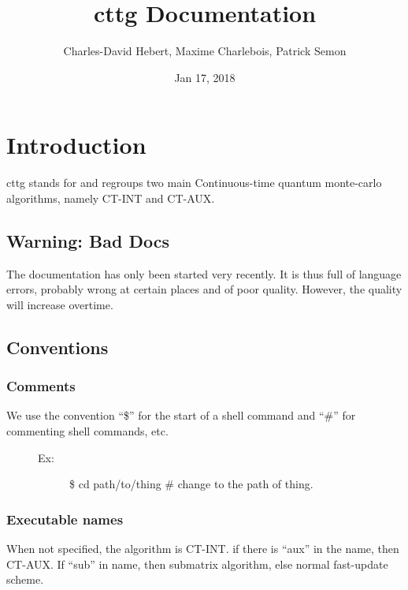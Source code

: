 \documentclass[letterpaper,10pt,english]{sphinxmanual}
\title{cttg Documentation}
\date{Jan 17, 2018}
\author{Charles-David Hebert, Maxime Charlebois, Patrick Semon}
\begin{document}
\maketitle
\sphinxtableofcontents
{}\label{\detokenize{index::doc}}



\chapter{Introduction}
\label{\detokenize{intro:welcome-to-cttg-s-documentation}}\label{\detokenize{intro:introduction}}\label{\detokenize{intro::doc}}
cttg stands for 
and regroups two main Continuous-time quantum monte-carlo algorithms, namely CT-INT and CT-AUX.


\section{Warning: Bad Docs}
\label{\detokenize{intro:warning-bad-docs}}
The documentation has only been started very recently. It is thus full of language errors, probably wrong at certain places and of poor quality.
However, the quality will increase overtime.


\section{Conventions}
\label{\detokenize{intro:conventions}}

\subsection{Comments}
\label{\detokenize{intro:comments}}\begin{description}
\item[{We use the convention ``\$'' for the start of a shell command and ``\#'' for commenting shell commands, etc.}] \leavevmode\begin{description}
\item[{Ex:}] \leavevmode
\$ cd path/to/thing    \# change to the path of thing.

\end{description}

\end{description}


\subsection{Executable names}
\label{\detokenize{intro:executable-names}}
When not specified, the algorithm is CT-INT. if there is ``aux'' in the name, then CT-AUX.
If ``sub'' in name, then submatrix algorithm, else normal fast-update scheme.
\end{document}
